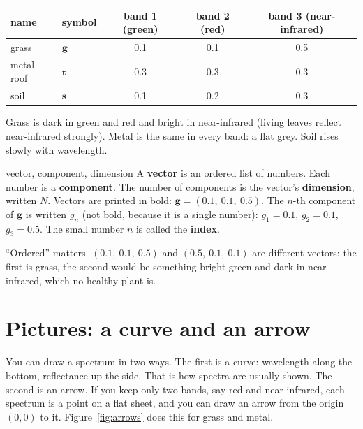 \documentclass[11pt,a4paper,oneside,openany]{book}
\newcommand{\B}[1]{{\symbf{#1}}}
\newcommand{\B}[1]{{\bm{#1}}}
\newcommand{\vt}{\B{t}}
\newcommand{\vg}{\B{g}}
\newcommand{\vs}{\B{s}}
\begin{document}
\begin{center}
\begin{tabular}{@{}llccc@{}}
\toprule
name & symbol & band 1 (green) & band 2 (red) & band 3 (near-infrared)\\
\midrule
grass & $\vg$ & 0.1 & 0.1 & 0.5\\
metal roof & $\vt$ & 0.3 & 0.3 & 0.3\\
soil & $\vs$ & 0.1 & 0.2 & 0.3\\
\bottomrule
\end{tabular}
\end{center}

Grass is dark in green and red and bright in near-infrared (living leaves reflect near-infrared strongly). Metal is the
same in every band: a flat grey. Soil rises slowly with wavelength.

\begin{defn}{vector, component, dimension}
A \textbf{vector} is an ordered list of numbers. Each number is a \textbf{component}. The number of components is the
vector's \textbf{dimension}, written $N$. Vectors are printed in bold: $\vg=(0.1,\ 0.1,\ 0.5)$. The $n$-th component of
$\vg$ is written $g_n$ (not bold, because it is a single number): $g_1=0.1$, $g_2=0.1$, $g_3=0.5$. The small number
$n$ is called the \textbf{index}.
\end{defn}

``Ordered'' matters. $(0.1,\ 0.1,\ 0.5)$ and $(0.5,\ 0.1,\ 0.1)$ are different vectors: the first is grass, the second
would be something bright green and dark in near-infrared, which no healthy plant is.

\section{Pictures: a curve and an arrow}

You can draw a spectrum in two ways. The first is a curve: wavelength along the bottom, reflectance up the side. That is
how spectra are usually shown. The second is an arrow. If you keep only two bands, say red and near-infrared, each
spectrum is a point on a flat sheet, and you can draw an arrow from the origin $(0,0)$ to it. Figure~\ref{fig:arrows}
does this for grass and metal.
\end{document}
